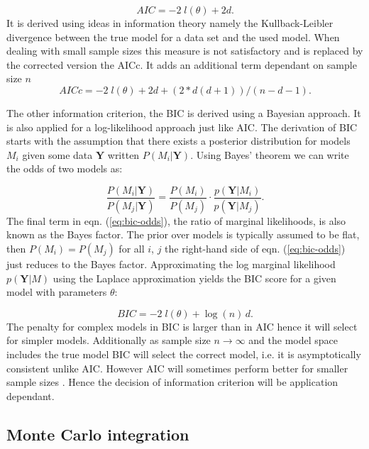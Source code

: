 \begin{equation}
  \label{eq:aic-def}
  AIC = -2 \;l(\theta) + 2 d.
\end{equation}
It is derived using ideas in information theory namely the Kullback-Leibler divergence between the true model for a data set and the used model. When dealing with small sample sizes this measure is not satisfactory and is replaced by the corrected version the AICc. It adds an additional term dependant on sample size $n$
\begin{equation}
 AICc = -2 \; l(\theta) +2d + (2 * d (d + 1)) / (n - d - 1).
\end{equation}


The other information criterion, the BIC is derived using a Bayesian approach. It is also applied for a log-likelihood approach just like AIC. The derivation of BIC starts with the assumption that there exists a posterior distribution for models $M_i$ given some data $\mathbf{Y}$ written $P(M_i| \mathbf{Y})$. Using Bayes' theorem we can write the odds of two models as:

\begin{equation}
  \label{eq:bic-odds}
  \frac{P(M_i|\mathbf{Y})}{P(M_j|\mathbf{Y})} = \frac{P(M_i)}{P(M_j)} \cdot \frac{p(\mathbf{Y}|M_i)}{p(\mathbf{Y} |M_j)}.
\end{equation}
The final term in eqn. (\ref{eq:bic-odds}), the ratio of marginal likelihoods, is also known as the Bayes factor. The prior over models is typically assumed to be flat, then $P(M_i) = P(M_j)$ for all $i$, $j$ the right-hand side of eqn. (\ref{eq:bic-odds}) just reduces to the Bayes factor. Approximating the log marginal likelihood $p(\mathbf{Y} | M)$ using the Laplace approximation yields the BIC score for a given model with parameters $\theta$:

\begin{equation}
  \label{eq:bic-def}
  BIC = -2 \; l(\theta) + \log(n) \,d.
\end{equation}
The penalty for complex models in BIC is larger than in AIC hence it will select for simpler models. Additionally as sample size $n\rightarrow \infty$ and the model space includes the true model BIC will select the correct model, i.e. it is asymptotically consistent unlike AIC. However AIC will sometimes perform better for smaller sample sizes \citep{hastie2001elements}. Hence the decision of information criterion will be application dependant.

\subsection{Monte Carlo integration}
\label{sec:monte-carlo-integr}

